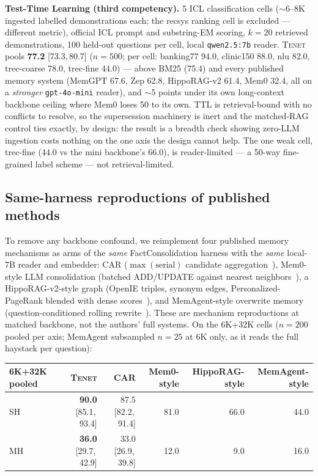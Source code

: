 \documentclass[11pt]{article}
\newcommand{\tenet}{\textsc{Tenet}}
\newcommand{\ci}[2]{{\footnotesize[#1,\,#2]}}
\begin{document}
\textbf{Test-Time Learning (third competency).} 5 ICL classification cells
($\sim$6--8K ingested labelled demonstrations each; the recsys ranking cell is excluded
--- different metric), official ICL prompt and substring-EM scoring, $k{=}20$ retrieved
demonstrations, 100 held-out questions per cell, local \texttt{qwen2.5:7b} reader.
\tenet{} pools \textbf{77.2} \ci{73.3}{80.7} ($n{=}500$; per cell: banking77 94.0,
clinic150 88.0, nlu 82.0, trec-coarse 78.0, trec-fine 44.0) --- above BM25 (75.4) and
every published memory system (MemGPT 67.6, Zep 62.8, HippoRAG-v2 61.4, Mem0 32.4,
all on a \emph{stronger} \texttt{gpt-4o-mini} reader), and $\sim$5 points under its own
long-context backbone ceiling where Mem0 loses 50 to its own. TTL is retrieval-bound
with no conflicts to resolve, so the supersession machinery is inert and the
matched-RAG control ties exactly, by design: the result is a breadth check showing
zero-LLM ingestion costs nothing on the one axis the design cannot help. The one weak
cell, trec-fine (44.0 vs the mini backbone's 66.0), is reader-limited --- a 50-way
fine-grained label scheme --- not retrieval-limited.

\subsection{Same-harness reproductions of published methods}\label{sec:baselines}
To remove any backbone confound, we reimplement four published memory mechanisms as arms
of the \emph{same} FactConsolidation harness with the \emph{same} local-7B reader and
embedder: CAR ($\max(\text{serial})$ candidate aggregation~\cite{freshness}), Mem0-style
LLM consolidation (batched ADD/UPDATE against nearest neighbors~\cite{mem0}), a
HippoRAG-v2-style graph (OpenIE triples, synonym edges, Personalized-PageRank blended
with dense scores~\cite{hipporag2}), and MemAgent-style overwrite memory
(question-conditioned rolling rewrite~\cite{memagent}). These are mechanism
reproductions at matched backbone, not the authors' full systems. On the 6K+32K cells
($n{=}200$ pooled per axis; MemAgent subsampled $n{=}25$ at 6K only, as it reads the
full haystack per question):

\begin{center}
\small
\begin{tabular}{lrrrrr}
\toprule
6K+32K pooled & \tenet{} & CAR & Mem0-style & HippoRAG-style & MemAgent-style\\
\midrule
SH & \textbf{90.0} \ci{85.1}{93.4} & 87.5 \ci{82.2}{91.4} & 81.0 & 66.0 & 44.0\\
MH & \textbf{36.0} \ci{29.7}{42.9} & 33.0 \ci{26.9}{39.8} & 12.0 & 9.0 & 16.0\\
\bottomrule
\end{tabular}
\end{center}
\end{document}
